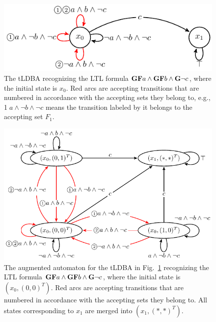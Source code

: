 \documentclass[letterpaper, 10 pt, conference]{ieeeconf}  %
\begin{document}
\begin{figure}[htbp]
   \centering
   \vspace{2mm}
   \includegraphics[bb=0 0 247 80,scale=0.65]{ldgba_original.pdf}
   \caption{The tLDBA recognizing the LTL formula $\text{{\bf GF}}a \wedge \text{{\bf GF}}b \wedge \text{{\bf G}}\neg c$, where the initial state is $x_0$. Red arcs are accepting transitions that are numbered in accordance with the accepting sets they belong to, e.g., \textcircled{\scriptsize 1}$a \land \neg b \land \neg c$ means the transition labeled by it belongs to the accepting set $F_1$.}
   \label{automaton}
\end{figure}

\begin{figure}[htbp]
   \centering
   \includegraphics[bb=0 0 374 207,scale=0.6]{ldgba.pdf}
   \caption{The augmented automaton for the tLDBA in Fig.~\ref{automaton} recognizing the LTL formula $\text{{\bf GF}}a \wedge \text{{\bf GF}}b \wedge \text{{\bf G}}\neg c$, where the initial state is $(x_0, (0,0)^T )$. Red arcs are accepting transitions that are numbered in accordance with the accepting sets they belong to. All states corresponding to $x_1$ are merged into $(x_1, (*,*)^T )$.}
   \label{automaton_aug}
\end{figure}
\end{document}

